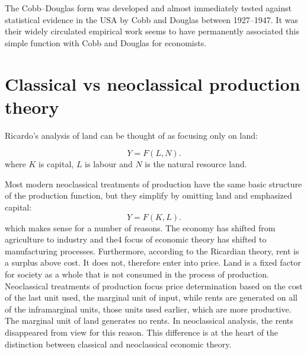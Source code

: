 The Cobb–Douglas form was developed and almost immediately tested against statistical evidence in the USA by Cobb and Douglas between 1927–1947. It was  their widely circulated empirical work seems to have permanently associated this simple function with Cobb and Douglas for economists.

\section{Classical vs neoclassical production theory}

Ricardo's analysis of land  can be thought of as focusing only on land:

\begin{equation} 
Y=F(L,N).
\label{eqn-production-ricardo-2}
\end{equation} 
where $K$ is capital, $L$ is labour and $N$  is the natural resource  land.

Most modern neoclassical treatments of production have the same basic structure of the production function, but they simplify by omitting land and emphasized capital:
\begin{equation} 
Y=F(K,L).
\label{eqn-production}
\end{equation}  
which makes sense for a number of reasons. The economy has shifted from agriculture to industry and the4 focus of economic theory has shifted to manufacturing processes.
Furthermore, according to the Ricardian theory, rent is a surplus above cost. It does not, therefore enter into price. Land is a fixed factor for society as a whole that is not consumed in  the process of production.  Neoclassical treatments of production focus price determination based on the cost of the last unit used, the marginal  unit of input, while rents are generated on all of the inframarginal units, those units used earlier, which are more productive. The marginal unit of land generates no rents. In neoclassical analysis, the rents disappeared from view for this reason. This difference is at the heart of the distinction between classical and neoclassical economic theory. 


